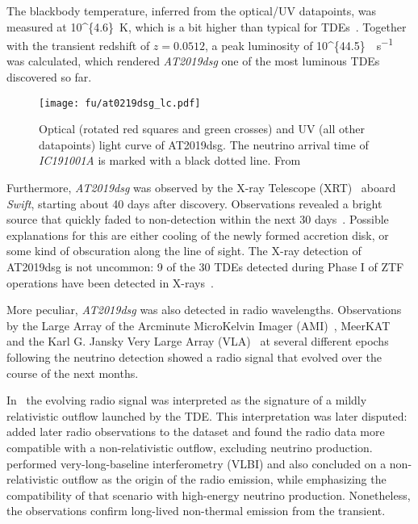 The blackbody temperature, inferred from the optical/UV datapoints, was measured at \SI[parse-numbers = false]{10^{4.6}}{\K}, which is a bit higher than typical for TDEs~. Together with the transient redshift of $z=0.0512$, a peak luminosity of \SI[parse-numbers = false]{10^{44.5}}{\erg\per\s} was calculated, which rendered \emph{AT2019dsg} one of the most luminous TDEs discovered so far.

\begin{figure*}[htb]
    \texttt{[image: fu/at0219dsg\_lc.pdf]}
    \caption[AT2019dsg optical/UV light curve]{Optical (rotated red squares and green crosses) and UV (all other datapoints) light curve of AT2019dsg. The neutrino arrival time of \textit{IC191001A} is marked with a black dotted line. From~\cite{Stein2021}}
\end{figure*}

Furthermore, \emph{AT2019dsg} was observed by the X-ray Telescope (XRT)~ aboard \textit{Swift}, starting about 40 days after discovery. Observations revealed a bright source that quickly faded to non-detection within the next 30 days~\cite{Stein2021}. Possible explanations for this are either cooling of the newly formed accretion disk, or some kind of obscuration along the line of sight. The X-ray detection of AT2019dsg is not uncommon: 9 of the 30 TDEs detected during Phase I of ZTF operations have been detected in X-rays~.

More peculiar, \emph{AT2019dsg} was also detected in radio wavelengths. Observations by the Large Array of the Arcminute MicroKelvin Imager (AMI)~, MeerKAT~ and the Karl G. Jansky Very Large Array (VLA)~ at several different epochs following the neutrino detection showed a radio signal that evolved over the course of the next months.

In~\cite{Stein2021} the evolving radio signal was interpreted as the signature of a mildly relativistic outflow launched by the TDE. This interpretation was later disputed:~ added later radio observations to the dataset and found the radio data more compatible with a non-relativistic outflow, excluding neutrino production.~ performed very-long-baseline interferometry (VLBI) and also concluded on a non-relativistic outflow as the origin of the radio emission, while emphasizing the compatibility of that scenario with high-energy neutrino production. Nonetheless, the observations confirm long-lived non-thermal emission from the transient.

